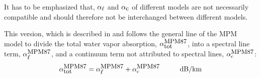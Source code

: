 It has to be emphasized that, $\alpha_{\ell}$ and $\alpha_{\mbox{\small c}}$ of different
models are not necessarily compatible and should therefore not be 
interchanged between different models.


\label{leveld:mpm87}
This version, which is described in \cite{liebeandlayton:87} and 
follows the general line of the MPM model to divide the total 
water vapor absorption, $\alpha^{\mbox{\rm \small MPM87}}_{\mbox{\small tot}}$, into a spectral line 
term, $\alpha^{\mbox{\rm \small MPM87}}_{\mbox{\small $\ell$}}$, and a continuum term not attributed to 
spectral lines, $\alpha^{\mbox{\rm \small MPM87}}_{\rm c}$:
\begin{equation}
  \label{eq:mpm87_abs}
  \alphampmotot = \alphampmol + \alphampmoc\hspace*{10mm}\mbox{dB/km}
\end{equation}



